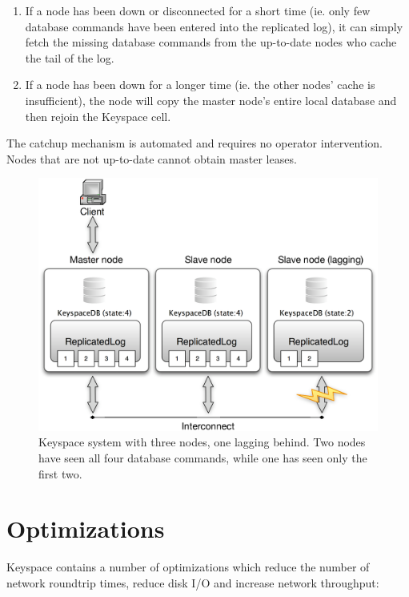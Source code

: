 \documentclass[12pt]{article}
\begin{document}
\begin{enumerate}
\item If a node has been down or disconnected for a short time (ie. only few database commands have been entered into the replicated log), it can simply fetch the missing database commands from the up-to-date nodes who cache the tail of the log.
\item If a node has been down for a longer time (ie. the other nodes' cache is insufficient), the node will copy the master node's entire local database and then rejoin the Keyspace cell.
\end{enumerate}

The catchup mechanism is automated and requires no operator intervention. Nodes that are not up-to-date cannot obtain master leases.

\begin{figure}[htbp]
\begin{center}
\includegraphics[scale=0.5]{comm1.eps}
\caption{Keyspace system with three nodes, one lagging behind. Two nodes have seen all four database commands, while one has seen only the first two.}
\end{center}
\end{figure}

\section{ Optimizations }

Keyspace contains a number of optimizations which reduce the number of network roundtrip times, reduce disk I/O and increase network throughput:
\end{document}
